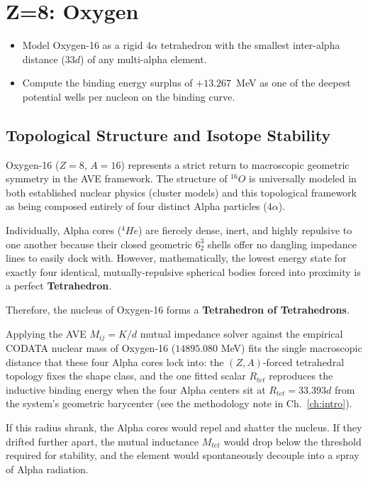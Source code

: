 \chapter{Z=8: Oxygen}
\label{ch:oxygen}


\begin{objectivebox}
\begin{itemize}
    \item Model Oxygen-16 as a rigid $4\alpha$ tetrahedron with the smallest inter-alpha distance ($33d$) of any multi-alpha element.
    \item Compute the binding energy surplus of $+13.267$~MeV as one of the deepest potential wells per nucleon on the binding curve.
\end{itemize}
\end{objectivebox}

\section{Topological Structure and Isotope Stability}
Oxygen-16 ($Z=8$, $A=16$) represents a strict return to macroscopic geometric symmetry in the AVE framework. The structure of $^{16}O$ is universally modeled in both established nuclear physics (cluster models) and this topological framework as being composed entirely of four distinct Alpha particles ($4\alpha$).

Individually, Alpha cores ($^4He$) are fiercely dense, inert, and highly repulsive to one another because their closed geometric $6^3_2$ shells offer no dangling impedance lines to easily dock with. However, mathematically, the lowest energy state for exactly four identical, mutually-repulsive spherical bodies forced into proximity is a perfect \textbf{Tetrahedron}.

Therefore, the nucleus of Oxygen-16 forms a \textbf{Tetrahedron of Tetrahedrons}. 

Applying the AVE $M_{ij} = K / d$ mutual impedance solver against the empirical CODATA nuclear mass of Oxygen-16 ($14895.080$ MeV) fits the single macroscopic distance that these four Alpha cores lock into: the $(Z,A)$-forced tetrahedral topology fixes the shape class, and the one fitted scalar $R_{tet}$ reproduces the inductive binding energy when the four Alpha centers sit at $R_{tet} = 33.393d$ from the system's geometric barycenter (see the methodology note in Ch.~\ref{ch:intro}).

If this radius shrank, the Alpha cores would repel and shatter the nucleus. If they drifted further apart, the mutual inductance $M_{tet}$ would drop below the threshold required for stability, and the element would spontaneously decouple into a spray of Alpha radiation.

